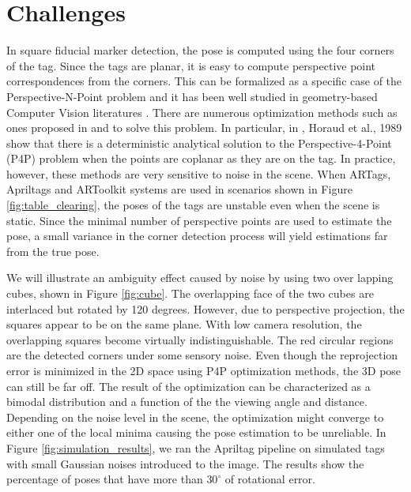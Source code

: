 \section{Challenges}
\label{sec:problem}


In square fiducial marker detection, the pose is computed using the four corners of the tag. Since the tags are planar, it is easy to compute perspective point correspondences from the corners. This can be formalized as a specific case of the Perspective-N-Point problem and it has been well studied in geometry-based Computer Vision literatures \citep{hartley2003multiple, zhang2005general}. There are numerous optimization methods such as ones proposed in \citep{dementhon1992exact} and \citep{haralick1994review} to solve this problem. In particular, in \citep{horaud1989analytic}, Horaud et al., 1989 show that there is a deterministic analytical solution to the Perspective-4-Point (P4P) problem when the points are coplanar as they are on the tag.  In practice, however, these methods are very sensitive to noise in the scene. When ARTags, Apriltags and ARToolkit systems are used in scenarios shown in Figure \ref{fig:table_clearing}, the poses of the tags are unstable even when the scene is static. Since the minimal number of perspective points are used to estimate the pose, a small variance in the corner detection process will yield estimations far from the true pose. 

We will illustrate an ambiguity effect caused by noise by using two over lapping cubes, shown in Figure \ref{fig:cube}. The overlapping face of the two cubes are interlaced but rotated by 120 degrees. However, due to perspective projection, the squares appear to be on the same plane. With low camera resolution, the overlapping squares become virtually indistinguishable. The red circular regions are the detected corners under some sensory noise. Even though the reprojection error is minimized in the 2D space using P4P optimization methods, the 3D pose can still be far off. The result of the optimization can be characterized as a bimodal distribution and a function of the the viewing angle and distance. Depending on the noise level in the scene, the optimization might converge to either one of the local minima causing the pose estimation to be unreliable. In Figure \ref{fig:simulation_results}, we ran the Apriltag pipeline on simulated tags with small Gaussian noises introduced to the image. The results show the percentage of poses that have more than $30^{\circ}$ of rotational error.